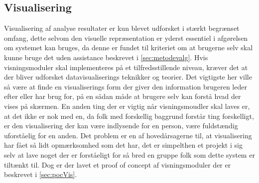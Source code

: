 \subsection{Visualisering}\label{sec:soevnVisVidArb}
Visualisering af analyse resultater er kun blevet udforsket i stærkt begrænset omfang, dette selvom den visuelle repræsentation er yderst essentiel i afgørelsen om systemet kan bruges, da denne er fundet til kriteriet om at brugerne selv skal kunne bruge det uden assistance beskrevet i \cref{sec:metodevalg}.
Hvis visningsmoduler skal implementeres på et tilfredsstillende niveau, kræver det at der bliver udforsket datavisualiserings teknikker og teorier.
Det vigtigste her ville så være at finde en visualiserings form der giver den information brugeren leder efter eller har brug for, på en sådan måde at brugere selv kan forstå hvad der vises på skærmen.
En anden ting der er vigtig når visningsmoudler skal laves er, at det ikke er nok med en, da folk med forskellig baggrund forstår ting forskelligt, er den visualisering der kan være indlysende for en person, være fuldstændig uforståelig for en anden.
Det problem er en af hovedårsagerne til, at visualisering har fået så lidt opmærksomhed som det har, det er simpelthen et projekt i sig selv at lave noget der er forståeligt for så bred en gruppe folk som dette system er tiltænkt til.
Dog er der lavet et proof of concept af visningsmoduler der er beskrevet i \cref{sec:pocVis}.